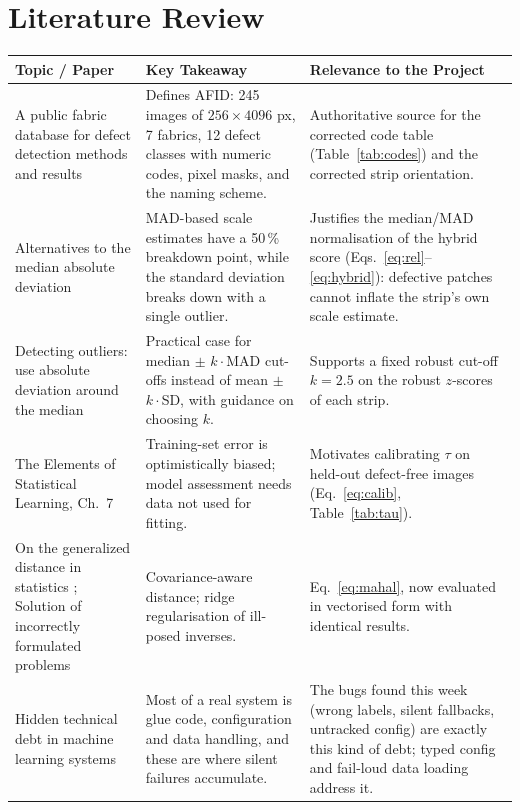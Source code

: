 \documentclass[11pt,a4paper]{article}
\newcommand{\code}[1]{\texttt{\detokenize{#1}}}
\begin{document}
\section*{Literature Review}

\begin{center}
\small
\renewcommand{\arraystretch}{1.15}
\begin{longtable}{@{}p{}p{}p{}@{}}
\toprule
\rowcolor{hdr}\textbf{Topic / Paper} & \textbf{Key Takeaway} & \textbf{Relevance to the Project} \\
\midrule
\endhead
A public fabric database for defect detection methods and results \cite{silvestre2019} & Defines AFID: 245 images of $256\times4096$ px, 7 fabrics, 12 defect classes with numeric codes, pixel masks, and the \code{nnnn_ddd_ff} naming scheme. & Authoritative source for the corrected code table (Table~\ref{tab:codes}) and the corrected strip orientation. \\
Alternatives to the median absolute deviation \cite{rousseeuw1993} & MAD-based scale estimates have a 50\,\% breakdown point, while the standard deviation breaks down with a single outlier. & Justifies the median/MAD normalisation of the hybrid score (Eqs.~\ref{eq:rel}--\ref{eq:hybrid}): defective patches cannot inflate the strip's own scale estimate. \\
Detecting outliers: use absolute deviation around the median \cite{leys2013} & Practical case for median $\pm$ $k\cdot$MAD cut-offs instead of mean $\pm$ $k\cdot$SD, with guidance on choosing $k$. & Supports a fixed robust cut-off $k=2.5$ on the robust $z$-scores of each strip. \\
The Elements of Statistical Learning, Ch.~7 \cite{hastie2009} & Training-set error is optimistically biased; model assessment needs data not used for fitting. & Motivates calibrating $\tau$ on held-out defect-free images (Eq.~\ref{eq:calib}, Table~\ref{tab:tau}). \\
On the generalized distance in statistics \cite{mahalanobis1936}; Solution of incorrectly formulated problems \cite{tikhonov1963} & Covariance-aware distance; ridge regularisation of ill-posed inverses. & Eq.~\eqref{eq:mahal}, now evaluated in vectorised form with identical results. \\
Hidden technical debt in machine learning systems \cite{sculley2015} & Most of a real system is glue code, configuration and data handling, and these are where silent failures accumulate. & The bugs found this week (wrong labels, silent fallbacks, untracked config) are exactly this kind of debt; typed config and fail-loud data loading address it. \\

\end{longtable}
\end{center}
\end{document}
